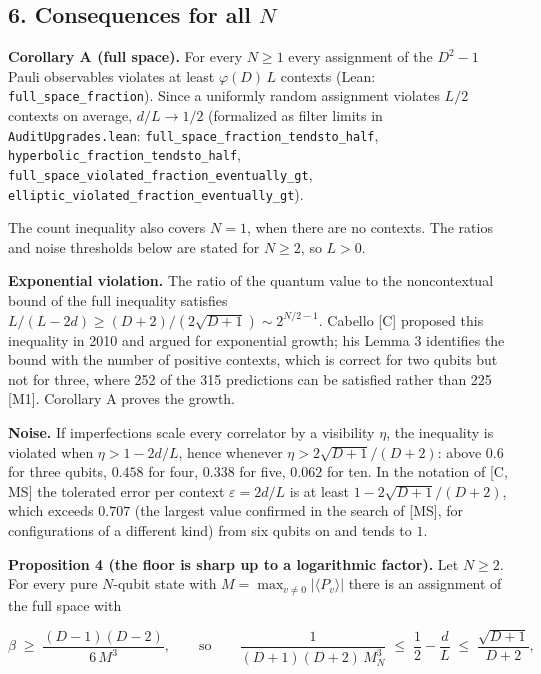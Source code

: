 \documentclass[11pt,a4paper]{article}
\newcommand{\gt}{>}
\begin{document}
\subsection{\texorpdfstring{6. Consequences for all \(N\)}{6. Consequences for all N}}\label{6-consequences-for-all-n}

\textbf{Corollary A (full space).} For every \(N \ge 1\) every assignment of the \(D^2 - 1\) Pauli observables
violates at least \(\varphi(D)\,L\) contexts (Lean: \nolinkurl{full_space_fraction}). Since a uniformly random
assignment violates \(L/2\) contexts on average, \(d/L \to 1/2\) (formalized as filter limits in
\nolinkurl{AuditUpgrades.lean}: \nolinkurl{full_space_fraction_tendsto_half}, \nolinkurl{hyperbolic_fraction_tendsto_half},
\nolinkurl{full_space_violated_fraction_eventually_gt}, \nolinkurl{elliptic_violated_fraction_eventually_gt}).

The count inequality also covers \(N=1\), when there are no contexts. The ratios and noise thresholds
below are stated for \(N\ge2\), so \(L\gt 0\).

\textbf{Exponential violation.} The ratio of the quantum value to the noncontextual bound of the full
inequality satisfies \(L/(L-2d) \ge (D+2)/(2\sqrt{D+1}) \sim 2^{N/2-1}\). Cabello {[}C{]} proposed this
inequality in 2010 and argued for exponential growth; his Lemma 3 identifies the bound with the number
of positive contexts, which is correct for two qubits but not for three, where 252 of the 315
predictions can be satisfied rather than 225 {[}M1{]}. Corollary A proves the growth.

\textbf{Noise.} If imperfections scale every correlator by a visibility \(\eta\), the inequality is violated
when \(\eta \gt 1 - 2d/L\), hence whenever \(\eta \gt 2\sqrt{D+1}/(D+2)\): above \(0.6\) for three qubits, \(0.458\)
for four, \(0.338\) for five, \(0.062\) for ten. In the notation of {[}C, MS{]} the tolerated error per context
\(\varepsilon = 2d/L\) is at least \(1 - 2\sqrt{D+1}/(D+2)\), which exceeds \(0.707\) (the largest value
confirmed in the search of {[}MS{]}, for configurations of a different kind) from six qubits on and tends
to \(1\).

\textbf{Proposition 4 (the floor is sharp up to a logarithmic factor).} Let \(N\ge2\). For every pure \(N\)-qubit state with
\(M = \max_{v \ne 0} |\langle P_v \rangle|\) there is an assignment of the full space with

\[\beta \;\ge\; \frac{(D-1)(D-2)}{6\,M^3}, \qquad\text{so}\qquad
\frac{1}{(D+1)(D+2)\,M_N^3} \;\le\; \frac12 - \frac{d}{L} \;\le\; \frac{\sqrt{D+1}}{D+2},\]
\end{document}
